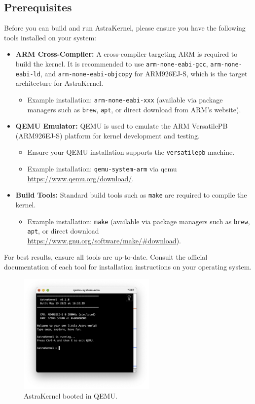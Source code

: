 \subsection{Prerequisites}

Before you can build and run AstraKernel, please ensure you have the following 
tools installed on your system:

\begin{itemize}
  \item \textbf{ARM Cross-Compiler:}  
  A cross-compiler targeting ARM is required to build the kernel. It 
  is recommended to use \texttt{arm-none-eabi-gcc}, \texttt{arm-none-eabi-ld}, 
  and \texttt{arm-none-eabi-objcopy} for ARM926EJ-S, which is the target architecture
  for AstraKernel.
  \begin{itemize}
    \item Example installation: \texttt{arm-none-eabi-xxx} (available via package 
    managers such as \texttt{brew}, \texttt{apt}, or direct download from ARM's website).
  \end{itemize}
  
  \item \textbf{QEMU Emulator:}  
  QEMU is used to emulate the ARM VersatilePB (ARM926EJ-S) platform for kernel development and testing.
  \begin{itemize}
    \item Ensure your QEMU installation supports the \texttt{versatilepb} machine.
    \item Example installation: \texttt{qemu-system-arm} via  qemu \url{https://www.qemu.org/download/}.
  \end{itemize}

  \item \textbf{Build Tools:}  
  Standard build tools such as \texttt{make} are required to compile the kernel.
  \begin{itemize}
    \item Example installation: \texttt{make} (available via package managers 
    such as \texttt{brew}, \texttt{apt}, or direct download \url{https://www.gnu.org/software/make/#download}).
  \end{itemize}
\end{itemize}

\noindent
For best results, ensure all tools are up-to-date. Consult the official documentation 
of each tool for installation instructions on your operating system.

\begin{figure}[!ht]
  \centering
  \includegraphics[width=0.6\textwidth]{figures/bootedKernel.png}
  \caption{AstraKernel booted in QEMU.}
  \label{fig:bootedKernel}
\end{figure}
